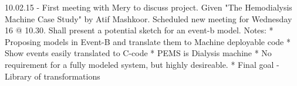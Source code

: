 10.02.15 - First meeting with Mery to discuss project. Given "The Hemodialysis Machine Case Study" by Atif Mashkoor. Scheduled new meeting for Wednesday 16 @ 10.30. Shall present a potential sketch for an event-b model.
Notes:
* Proposing models in Event-B and translate them to Machine deployable code
* Show events easily translated to C-code
* PEMS is Dialysis machine
* No requirement for a fully modeled system, but highly desireable.
* Final goal - Library of transformations
